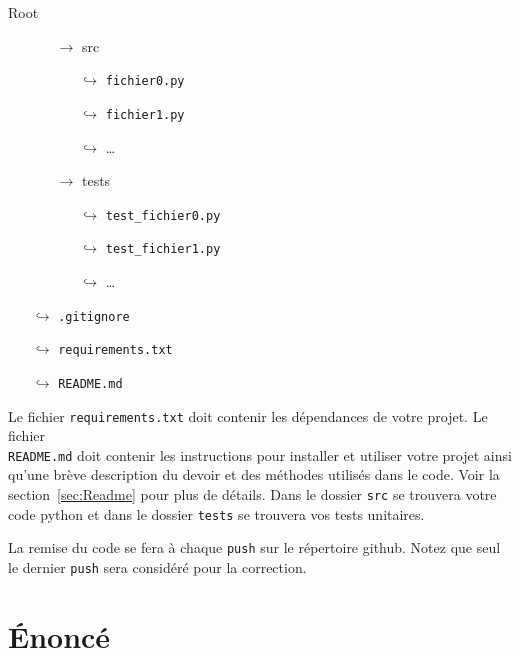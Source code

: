 \documentclass[12pt, letterpaper]{article}
\numberwithin{table}{section}
\numberwithin{figure}{section}
\numberwithin{equation}{section}
\begin{document}
\noindent Root
\begin{itemize}
    \item[]
        \begin{itemize}
            \item[$\rightarrow$] src
                \begin{itemize}
                    \item[$\hookrightarrow$] \texttt{fichier0.py}
                    \item[$\hookrightarrow$] \texttt{fichier1.py}
                    \item[$\hookrightarrow$] \dots
              \end{itemize}
        \end{itemize}
  \item[]
  \begin{itemize}
    \item[$\rightarrow$] tests
    \begin{itemize}
      \item[$\hookrightarrow$] \texttt{test\_fichier0.py}
      \item[$\hookrightarrow$] \texttt{test\_fichier1.py}
      \item[$\hookrightarrow$] \dots
    \end{itemize}
  \end{itemize}
  \item[$\hookrightarrow$] \texttt{.gitignore}
  \item[$\hookrightarrow$] \texttt{requirements.txt}
  \item[$\hookrightarrow$] \texttt{README.md}
\end{itemize}

\bigskip

\noindent Le fichier \texttt{requirements.txt} doit contenir les dépendances de votre projet.
Le fichier \\\texttt{README.md} doit contenir les instructions pour installer et utiliser votre projet ainsi
qu'une brève description du devoir et des méthodes utilisés dans le code.
Voir la section~\ref{sec:Readme} pour plus de détails.
Dans le dossier \texttt{src} se trouvera votre code python et dans le dossier \texttt{tests} se trouvera vos tests
unitaires.

\bigskip

\noindent La remise du code se fera à chaque \texttt{push} sur le répertoire github.
Notez que seul le dernier \texttt{push} sera considéré pour la correction.


\section{Énoncé}\label{sec:enonce}
\end{document}
